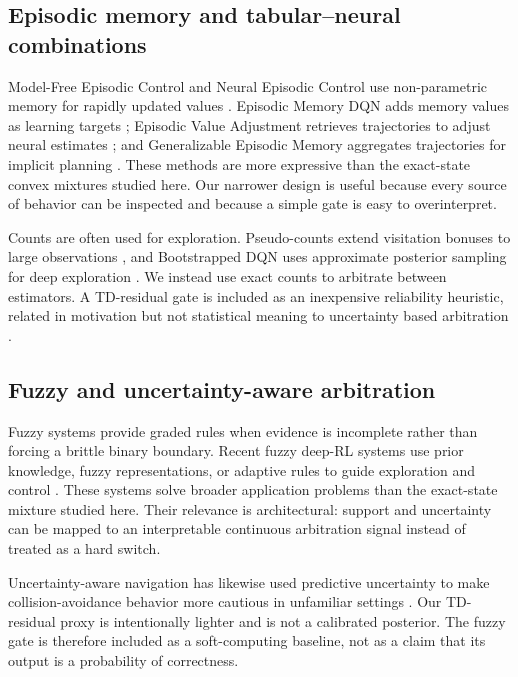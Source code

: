 \documentclass[preprint,12pt]{elsarticle}
\begin{document}
\subsection{Episodic memory and tabular--neural combinations}

Model-Free Episodic Control and Neural Episodic Control use non-parametric
memory for rapidly updated values \cite{blundell2016model,pritzel2017nec}.
Episodic Memory DQN adds memory values as learning targets
\cite{lin2018emdqn}; Episodic Value Adjustment retrieves trajectories to
adjust neural estimates \cite{hansen2018fast}; and Generalizable Episodic
Memory aggregates trajectories for implicit planning \cite{hu2021gem}. These
methods are more expressive than the exact-state convex mixtures studied
here. Our narrower design is useful because every source of behavior can be
inspected and because a simple gate is easy to overinterpret.

Counts are often used for exploration. Pseudo-counts extend visitation bonuses
to large observations \cite{bellemare2016count}, and Bootstrapped DQN uses
approximate posterior sampling for deep exploration
\cite{osband2016bootstrapped}. We instead use exact counts to arbitrate between
estimators. A TD-residual gate is included as an inexpensive reliability
heuristic, related in motivation but not statistical meaning to uncertainty
based arbitration \cite{daw2005arbitration}.

\subsection{Fuzzy and uncertainty-aware arbitration}

Fuzzy systems provide graded rules when evidence is incomplete rather than
forcing a brittle binary boundary. Recent fuzzy deep-RL systems use prior
knowledge, fuzzy representations, or adaptive rules to guide exploration and
control \cite{qin2025knowledge,tilahun2024fuzzy,chen2026fuzzyadaptive}.
These systems solve broader application problems than the exact-state mixture
studied here. Their relevance is architectural: support and uncertainty can be
mapped to an interpretable continuous arbitration signal instead of treated as
a hard switch.

Uncertainty-aware navigation has likewise used predictive uncertainty to make
collision-avoidance behavior more cautious in unfamiliar settings
\cite{kahn2017uncertainty}. Our TD-residual proxy is intentionally lighter and
is not a calibrated posterior. The fuzzy gate is therefore included as a
soft-computing baseline, not as a claim that its output is a probability of
correctness.
\end{document}

